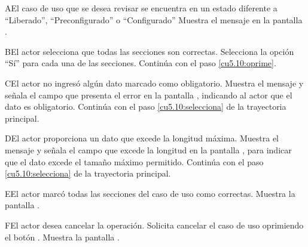  \begin{UCtrayectoriaA}{A}{El caso de uso que se desea revisar se encuentra en un estado diferente a ``Liberado'', ``Preconfigurado'' o ``Configurado''}
    \UCpaso[\UCsist] Muestra el mensaje  en la pantalla .
 \end{UCtrayectoriaA} 
 
 \begin{UCtrayectoriaA}{B}{El actor selecciona que todas las secciones son correctas.}
    \UCpaso[\UCactor] Selecciona la opción ``Sí'' para cada una de las secciones.
	\UCpaso[] Continúa con el paso \ref{cu5.10:oprime}.
 \end{UCtrayectoriaA}
 
 \begin{UCtrayectoriaA}{C}{El actor no ingresó algún dato marcado como obligatorio.}
    \UCpaso[\UCsist] Muestra el mensaje  y señala el campo que presenta el error en la pantalla , indicando al actor que el dato es obligatorio.
    \UCpaso[] Continúa con el paso \ref{cu5.10:selecciona} de la trayectoria principal.
 \end{UCtrayectoriaA}
 
 \begin{UCtrayectoriaA}{D}{El actor proporciona un dato que excede la longitud máxima.}
    \UCpaso[\UCsist] Muestra el mensaje  y señala el campo que excede la 
    longitud en la pantalla , para indicar que el dato excede el tamaño máximo permitido.
    \UCpaso[] Continúa con el paso \ref{cu5.10:selecciona} de la trayectoria principal.
 \end{UCtrayectoriaA}
 
 \begin{UCtrayectoriaA}{E}{El actor marcó todas las secciones del caso de uso como correctas.}
    \UCpaso[\UCsist] Muestra la pantalla .
 \end{UCtrayectoriaA}
 
 \begin{UCtrayectoriaA}{F}{El actor desea cancelar la operación.}
    \UCpaso[\UCactor] Solicita cancelar el caso de uso oprimiendo el botón .
    \UCpaso[\UCsist] Muestra la pantalla .
 \end{UCtrayectoriaA}